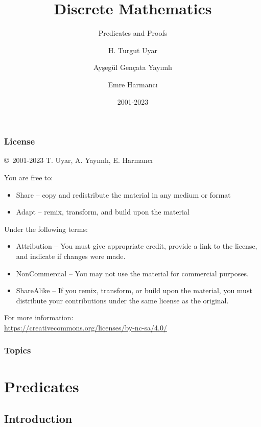 \documentclass[dvipsnames]{beamer}
\title{Discrete Mathematics}
\subtitle{Predicates and Proofs}
\author{H. Turgut Uyar \and Ayşegül Gençata Yayımlı \and Emre Harmancı}
\date{2001-2023}
\begin{document}
\begin{frame}
  \titlepage
\end{frame}

\begin{frame}
  \frametitle{License}

  \hfill
  \copyright~2001-2023 T. Uyar, A. Yayımlı, E. Harmancı

  \vfill
  \begin{footnotesize}
    You are free to:
    \begin{itemize}
      \itemsep0em
      \item Share -- copy and redistribute the material in any medium or format
      \item Adapt -- remix, transform, and build upon the material
    \end{itemize}

    Under the following terms:
    \begin{itemize}
      \itemsep0em
      \item Attribution -- You must give appropriate credit, provide a link to
        the license, and indicate if changes were made.

      \item NonCommercial -- You may not use the material for commercial
        purposes.

      \item ShareAlike -- If you remix, transform, or build upon the material,
        you must distribute your contributions under the same license as the
        original.
    \end{itemize}
  \end{footnotesize}

  \begin{small}
    For more information:\\
    \url{https://creativecommons.org/licenses/by-nc-sa/4.0/}
  \end{small}
\end{frame}

\begin{frame}
  \frametitle{Topics}
  \tableofcontents
\end{frame}

\section{Predicates}

\subsection{Introduction}
\end{document}
